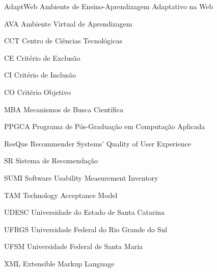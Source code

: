 \documentclass[
	12pt,				%
	openright,			%
	oneside,
	a4paper,			%
	chapter=TITLE,		%
	section=TITLE,		%
	english,			%
	brazil,				%
  hidelinks
	]{abntex2}
\begin{document}


\begin{siglas}
  \SingleSpacing
  \item[AdaptWeb]   Ambiente de Ensino-Aprendizagem Adaptativo na Web
  \item[AVA]        Ambiente Virtual de Aprendizagem
  \item[CCT]        Centro de Ciências Tecnológicas
  \item[CE]         Critério de Exclusão
  \item[CI]         Critério de Inclusão
  \item[CO]         Critério Objetivo
  \item[MBA]        Mecanismos de Busca Científica
  \item[PPGCA]      Programa de Pós-Graduação em Computação Aplicada
  \item[ResQue]     Recommender Systems' Quality of User Experience
  \item[SR]         Sistema de Recomendação
  \item[SUMI]       Software Usability Measurement Inventory
  \item[TAM]        Technology Acceptance Model
  \item[UDESC]      Universidade do Estado de Santa Catarina
  \item[UFRGS]      Universidade Federal do Rio Grande do Sul
  \item[UFSM]       Universidade Federal de Santa Maria
  \item[XML]        Extensible Markup Language
\end{siglas}


\tableofcontents*
\cleardoublepage

\textual

\pagestyle{eudesc}









%
\end{document}

